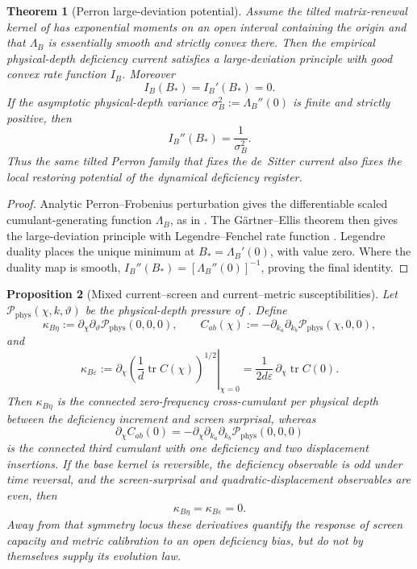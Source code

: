 \documentclass[11pt]{article}
\newtheorem{theorem}{Theorem}[section]
\newtheorem{proposition}[theorem]{Proposition}
\theoremstyle{definition}
\theoremstyle{remark}
\newcommand{\eps}{\varepsilon}
\newcommand{\tr}{\operatorname{tr}}
\newcommand{\Pphys}{\mathcal P_{\mathrm{phys}}}
\begin{document}
\begin{theorem}[Perron large-deviation potential]
\label{thm:deficiency-rate-function}
Assume the tilted matrix-renewal kernel of
 has exponential moments on an open interval
containing the origin and that \(\Lambda_B\) is essentially smooth and strictly
convex there.  Then the empirical physical-depth deficiency current satisfies a
large-deviation principle with good convex rate function \(I_B\).  Moreover
\[
  I_B(B_*)=I_B'(B_*)=0.
\]
If the asymptotic physical-depth variance
\(\sigma_B^2:=\Lambda_B''(0)\) is finite and strictly positive, then
\[
  I_B''(B_*)=\frac{1}{\sigma_B^2}.
\]
Thus the same tilted Perron family that fixes the de~Sitter current also fixes the
local restoring potential of the dynamical deficiency register.
\end{theorem}

\begin{proof}
Analytic Perron--Frobenius perturbation gives the differentiable scaled
cumulant-generating function \(\Lambda_B\), as in
.  The G\"artner--Ellis theorem then gives
the large-deviation principle with Legendre--Fenchel rate function
\cite{DemboZeitouni,Touchette2009}.  Legendre duality places the unique minimum
at \(B_*=\Lambda_B'(0)\), with value zero.  Where the duality map is smooth,
\(I_B''(B_*)=[\Lambda_B''(0)]^{-1}\), proving the final identity.
\end{proof}

\begin{proposition}[Mixed current--screen and current--metric susceptibilities]
\label{prop:mixed-perron-susceptibilities}
Let \(\Pphys(\chi,k,\vartheta)\) be the physical-depth pressure of
.  Define
\[
 \kappa_{B\eta}:=\partial_\chi\partial_\vartheta\Pphys(0,0,0),
 \qquad
 C_{ab}(\chi):=-\partial_{k_a}\partial_{k_b}\Pphys(\chi,0,0),
\]
and
\[
 \kappa_{B\eps}:=
 \left.\partial_\chi\left(\frac1d\tr C(\chi)\right)^{1/2}\right|_{\chi=0}
 =\frac{1}{2d\eps}\,\partial_\chi\tr C(0).
\]
Then \(\kappa_{B\eta}\) is the connected zero-frequency cross-cumulant per
physical depth between the deficiency increment and screen surprisal, whereas
\[
  \partial_\chi C_{ab}(0)
  =-\partial_\chi\partial_{k_a}\partial_{k_b}\Pphys(0,0,0)
\]
is the connected third cumulant with one deficiency and two displacement
insertions.  If the base kernel is reversible, the deficiency observable is odd
under time reversal, and the screen-surprisal and quadratic-displacement
observables are even, then
\[
  \kappa_{B\eta}=\kappa_{B\eps}=0.
\]
Away from that symmetry locus these derivatives quantify the response of screen
capacity and metric calibration to an open deficiency bias, but do not by
themselves supply its evolution law.
\end{proposition}
\end{document}
